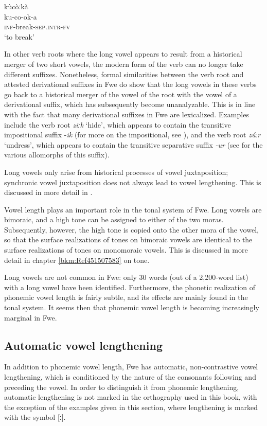 \ex
\glll kùcòːkà\\
ku-co-ok-a\\
\textsc{inf}-break-\textsc{sep}.\textsc{intr}-\textsc{fv}\\
\glt ‘to break’
\z
\z

In other verb roots where the long vowel appears to result from a historical merger of two short vowels, the modern form of the verb can no longer take differ\-ent suffixes. Nonetheless, formal similarities between the verb root and attested derivational suffixes in Fwe do show that the long vowels in these verbs go back to a historical merger of the vowel of the root with the vowel of a derivational suffix, which has subsequently become unanalyza\-ble. This is in line with the fact that many derivational suffixes in Fwe are lexicalized. Examples include the verb root \textit{ziːk} ‘hide’, which appears to contain the transitive impositional suffix -\textit{ik} (for more on the impositional, see ), and the verb root \textit{zúːr} ‘undress’, which appears to contain the transitive separative suffix \textit{-ur} (see  for the various allo\-morphs of this suffix).

Long vowels only arise from historical processes of vowel juxtaposition; synchronic vowel juxta\-position does not always lead to vowel lengthening. This is discussed in more detail in .

Vowel length plays an important role in the tonal system of Fwe. Long vowels are bimoraic, and a high tone can be assigned to either of the two moras. Subsequently, however, the high tone is copied onto the other mora of the vowel, so that the surface realizations of tones on bimoraic vowels are identical to the surface realizations of tones on monomoraic vowels. This is discussed in more detail in chapter \ref{bkm:Ref451507583} on tone.

Long vowels are not common in Fwe: only 30 words (out of a 2,200-word list) with a long vowel have been identified. Furthermore, the phonetic realization of phonemic vowel length is fairly subtle, and its effects are mainly found in the tonal system. It seems then that phonemic vowel length is becoming increasingly marginal in Fwe.

\subsection{Automatic vowel lengthening}
\label{bkm:Ref459132421}\hypertarget{Toc75352606}{}
In addition to phonemic vowel length, Fwe has automatic, non-contrastive vowel lengthening, which is conditioned by the nature of the consonants following and preceding the vowel. In order to distinguish it from phonemic lengthening, automatic lengthening is not marked in the orthography used in this book, with the exception of the examples given in this section, where lengthening is marked with the symbol [ː].

